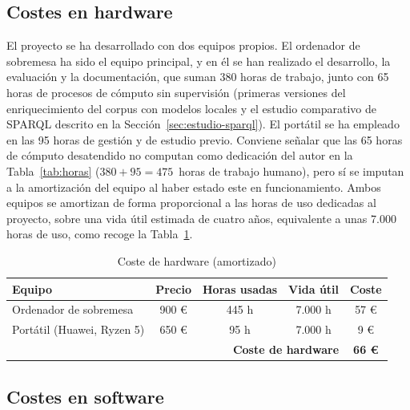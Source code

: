 \documentclass[11pt, a4paper]{report}
\begin{document}
	\subsection{Costes en hardware}

	El proyecto se ha desarrollado con dos equipos propios. El ordenador de sobremesa ha sido el equipo principal, y en él se han realizado el desarrollo, la evaluación y la documentación, que suman 380 horas de trabajo, junto con 65 horas de procesos de cómputo sin supervisión (primeras versiones del enriquecimiento del corpus con modelos locales y el estudio comparativo de SPARQL descrito en la Sección~\ref{sec:estudio-sparql}). El portátil se ha empleado en las 95 horas de gestión y de estudio previo. Conviene señalar que las 65 horas de cómputo desatendido no computan como dedicación del autor en la Tabla~\ref{tab:horas} ($380 + 95 = 475$~horas de trabajo humano), pero sí se imputan a la amortización del equipo al haber estado este en funcionamiento. Ambos equipos se amortizan de forma proporcional a las horas de uso dedicadas al proyecto, sobre una vida útil estimada de cuatro años, equivalente a unas 7.000 horas de uso, como recoge la Tabla~\ref{tab:coste-hardware}.

	\begin{table}[H]
		\centering
		\begin{tabular}{|l|c|c|c|c|}
			\hline
			\rowcolor{tabla-header}
			\textbf{Equipo} & \textbf{Precio} & \textbf{Horas usadas} & \textbf{Vida útil} & \textbf{Coste} \\
			\hline
			Ordenador de sobremesa\footnotemark & 900 € & 445 h & 7.000 h & 57 € \\
			\hline
			\rowcolor{fila-alterna}
			Portátil (Huawei, Ryzen 5) & 650 € & 95 h & 7.000 h & 9 € \\
			\hline
			\multicolumn{4}{|r|}{\textbf{Coste de hardware}} & \textbf{66 €} \\
			\hline
		\end{tabular}
		\caption{Coste de hardware (amortizado)}
		\label{tab:coste-hardware}
	\end{table}

	\subsection{Costes en software}
\end{document}
